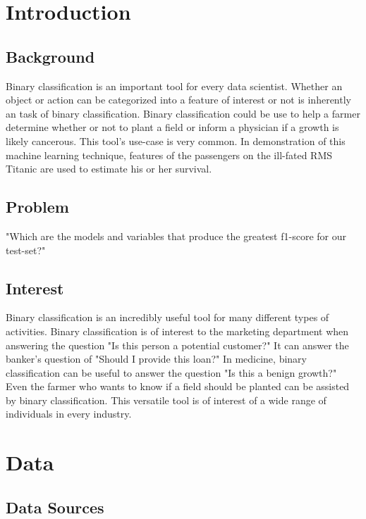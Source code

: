 \documentclass[10pt]{article}
\begin{document}
\begin{multicols}{2}
\section{Introduction}
\subsection{Background}
	
	Binary classification is an important tool for every data scientist.
	Whether an object or action can be categorized into a feature of interest or not is inherently an task of binary classification.
	Binary classification could be use to help a farmer determine whether or not to plant a field or inform a physician if a growth is likely cancerous.
	This tool's use-case is very common.
	In demonstration of this machine learning technique, features of the passengers on the ill-fated RMS Titanic are used to estimate his or her survival.
	
\subsection{Problem}	
	
	"Which are the models and variables that produce the greatest f1-score for our test-set?"

\subsection{Interest}
	
	Binary classification is an incredibly useful tool for many different types of activities.
	Binary classification is of interest to the marketing department when answering the question "Is this person a potential customer?"
	It can answer the banker's question of "Should I provide this loan?"
	In medicine, binary classification can be useful to answer the question "Is this a benign growth?"
	Even the farmer who wants to know if a field should be planted can be assisted by binary classification.
	This versatile tool is of interest of a wide range of individuals in every industry.

\section{Data} \label{documentclasses}
\subsection{Data Sources}


\end{multicols}
\end{document}
